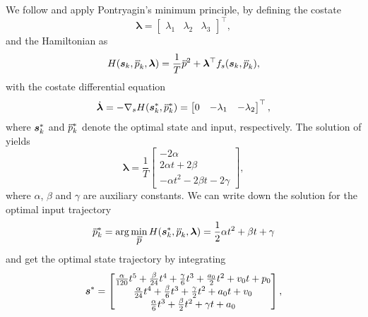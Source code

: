 We follow \cite{MuellerHehn15} and apply Pontryagin's minimum principle, by defining the costate
\begin{equation}
	\bm{\lambda} =
	\begin{bmatrix}
		\lambda_1 & \lambda_2 & \lambda_3
	\end{bmatrix}^\top
	,
\end{equation}
and the Hamiltonian as
\begin{equation}
	H(\mbox{$\bm{s}$}_k,\mbox{$\dddot{p}$}_k, \bm{\lambda}) = \frac{1}{T} \mbox{$\dddot{p}$}^2
	+ \bm{\lambda}^\top f_s(\mbox{$\bm{s}$}_k, \mbox{$\dddot{p}$}_k)
	,
\end{equation}
with the costate differential equation
\begin{equation}
	\label{eq:costate-differential-equation}
	\dot{\bm{\lambda}} = -\nabla_s H(\mbox{$\bm{s}$}_k^*, \mbox{$\dddot{p}$}_k^*) = 
	\begin{bmatrix}
		0 & -\lambda_1 & -\lambda_2
	\end{bmatrix}^\top
	,
\end{equation}
where $\mbox{$\bm{s}$}_k^*$ and $\mbox{$\dddot{p}$}_k^*$ denote the optimal state and input, respectively. The solution of  yields
\begin{equation}
	\bm{\lambda} = \frac{1}{T}
	\begin{bmatrix}
		- 2 \alpha \\
		2 \alpha t + 2 \beta \\
		- \alpha t^2 - 2 \beta t - 2\gamma
	\end{bmatrix},
\end{equation}
where $\alpha$, $\beta$ and $\gamma$ are auxiliary constants.
We can write down the solution for the optimal input trajectory
\begin{equation}
	\label{eq:input-optimal-trajectory}
	\mbox{$\dddot{p}$}_k^* = \arg\min_{\mbox{$\dddot{p}$}}H(\mbox{$\bm{s}$}_k^*,\mbox{$\dddot{p}$}_k, \bm{\lambda}) = 
	\frac{1}{2}\alpha t^2 + \beta t + \gamma
\end{equation}
and get the optimal state trajectory by integrating 
\begin{equation}
	\label{eq:optimal-trajectory-per-axis}
	\mbox{$\bm{s}$}^* = 
	\begin{bmatrix}
		\frac{\alpha}{120}t^5
		+ \frac{\beta}{24}t^4
		+ \frac{\gamma}{6}t^3
		+ \frac{a_0}{2}t^2
		+ v_0 t
		+ p_0
		\\
		\frac{\alpha}{24} t^4
		+ \frac{\beta}{6} t^3
		+ \frac{\gamma}{2} t^2
		+ a_0 t
		+ v_0
		\\
		\frac{\alpha}{6} t^3
		+ \frac{\beta}{2} t^2
		+ \gamma t
		+ a_0
	\end{bmatrix}
	,
\end{equation}
